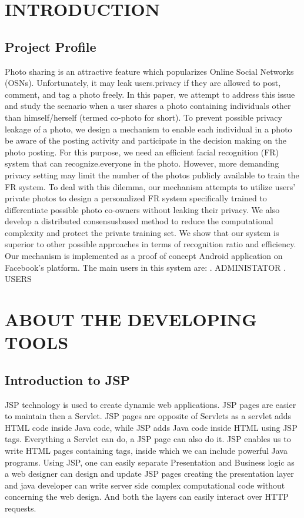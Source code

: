 \documentclass[a4paper,12pt]{article}
\begin{document}
\tableofcontents
 \newpage
 \newpage
\section{INTRODUCTION}
  \hspace{5mm}  
\subsection{ Project Profile}
\hspace{5mm}         
Photo sharing is an attractive feature which popularizes Online Social Networks (OSNs). Unfortunately, it may leak users.privacy if they are allowed to post, comment, and tag a photo freely. In this paper, we attempt to address this issue and study the scenario when a user shares a photo containing individuals other than himself/herself (termed co-photo for short). To prevent possible privacy leakage of a photo, we design a mechanism to enable each individual in a photo be aware of the posting activity and participate in the decision making on the photo posting. For this purpose, we need an efficient facial recognition (FR) system that can recognize.everyone in the photo. However, more demanding privacy setting may limit the number of the photos publicly available to train the
FR system. To deal with this dilemma, our mechanism attempts to utilize users’ private photos to design a personalized FR system specifically trained to differentiate possible photo co-owners without leaking their privacy. We also develop a distributed consensusbased
method to reduce the computational complexity and protect the private training set. We show that our system is superior to other possible approaches in terms of recognition ratio and efficiency. Our mechanism is implemented as a proof of concept Android
application on Facebook’s platform.
The main users in this system are:
\vspace{5mm}.  ADMINISTATOR
\vspace{5mm}.  USERS
\newpage
\section{ABOUT THE DEVELOPING TOOLS}  
\subsection{Introduction to JSP}
\hspace{5mm}       
 JSP technology is used to create dynamic web applications. JSP pages are easier to maintain then a Servlet. JSP pages are opposite of Servlets as a servlet adds HTML code inside Java code, while JSP adds Java code inside HTML using JSP tags. Everything a Servlet can do, a JSP page can also do it.
JSP enables us to write HTML pages containing tags, inside which we can include powerful Java programs. Using JSP, one can easily separate Presentation and Business logic as a web designer can design and update JSP pages creating the presentation layer and java developer can write server side complex computational code without concerning the web design. And both the layers can easily interact over HTTP requests. 
\newpage
\end{document}

